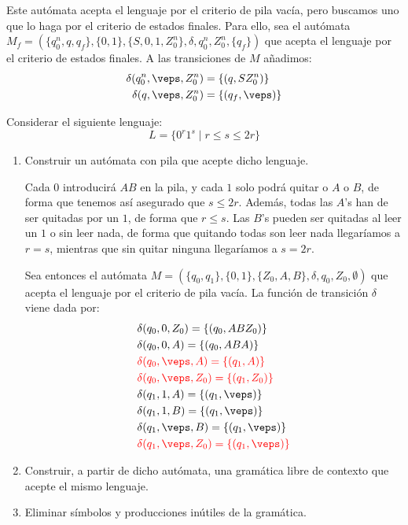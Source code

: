 \begin{ejercicio}
\begin{enumerate}
        Este autómata acepta el lenguaje por el criterio de pila vacía, pero buscamos uno que lo haga por el criterio de estados finales. Para ello, sea el autómata $M_f = (\{q_0^n, q, q_f\},\{0,1\},\{S,0,1, Z_0^n\},\delta,q_0^n,Z_0^n,\{q_f\})$ que acepta el lenguaje por el criterio de estados finales. A las transiciones de $M$ añadimos:
        \begin{align*}
            \delta(q_0^n,\veps,Z_0^n) &= \{(q,SZ_0^n)\} \\
            \delta(q,\veps,Z_0^n) &= \{(q_f,\veps)\}
        \end{align*}
    \end{enumerate}
\end{ejercicio}

\begin{ejercicio}\label{ej:1.5.11}
    Considerar el siguiente lenguaje:
    \begin{equation*}
        L = \{0^r 1^s \mid r\leq s \leq 2r\}
    \end{equation*}
    \begin{enumerate}
        \item Construir un autómata con pila que acepte dicho lenguaje.
        
        Cada $0$ introducirá $AB$ en la pila, y cada $1$ solo podrá quitar o $A$ o $B$, de forma que tenemos así asegurado que $s\leq 2r$. Además, todas las $A$'s han de ser quitadas por un $1$, de forma que $r\leq s$. Las $B$'s pueden ser quitadas al leer un $1$ o sin leer nada, de forma que quitando todas son leer nada llegaríamos a $r=s$, mientras que sin quitar ninguna llegaríamos a $s=2r$.

        Sea entonces el autómata $M = (\{q_0,q_1\},\{0,1\},\{Z_0,A,B\},\delta,q_0,Z_0,\emptyset)$ que acepta el lenguaje por el criterio de pila vacía. La función de transición $\delta$ viene dada por:
        \begin{align*}
            &\delta(q_0,0,Z_0) = \{(q_0,ABZ_0)\} \\
            &\delta(q_0,0,A) = \{(q_0,ABA)\} \\
            &\red{\delta(q_0,\veps,A) = \{(q_1,A)\}} \\
            &\red{\delta(q_0,\veps,Z_0) = \{(q_1,Z_0)\}} \\
            &\delta(q_1,1,A) = \{(q_1,\veps)\} \\
            &\delta(q_1,1,B) = \{(q_1,\veps)\} \\
            &\delta(q_1,\veps,B) = \{(q_1,\veps)\}\\
            &\red{\delta(q_1,\veps,Z_0) = \{(q_1,\veps)\}}
        \end{align*}
        \item Construir, a partir de dicho autómata, una gramática libre de contexto que acepte el mismo lenguaje.
        
        \item Eliminar símbolos y producciones inútiles de la gramática.
    \end{enumerate}
\end{ejercicio}

